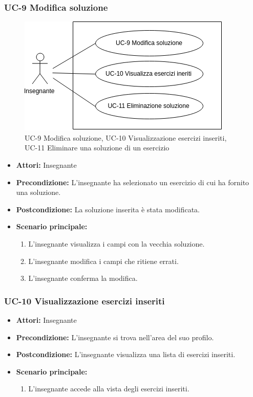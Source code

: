 \subsubsection{UC-9 Modifica soluzione}
\begin{figure}[h]
			\centering
			\includegraphics[scale=0.7]{images/UC-9.png}
			\caption{UC-9 Modifica soluzione, UC-10 Visualizzazione esercizi inseriti, UC-11 Eliminare una soluzione di un esercizio}
		\end{figure}
\begin{itemize}

\item \textbf{Attori: }Insegnante
\item \textbf{Precondizione: }L'insegnante ha selezionato un esercizio di cui ha fornito una soluzione.
\item \textbf{Postcondizione: }La soluzione inserita è stata modificata.
\item \textbf{Scenario principale: }
		\begin{enumerate}
		\item L'insegnante visualizza i campi con la vecchia soluzione.
		\item L'insegnante modifica i campi che ritiene errati.
		\item L'insegnante conferma la modifica.
		\end{enumerate}
\end{itemize}

\subsubsection{UC-10 Visualizzazione esercizi inseriti}
\begin{itemize}
\item \textbf{Attori: }Insegnante
		\item \textbf{Precondizione: }L'insegnante si trova nell'area del suo profilo.
		\item \textbf{Postcondizione: }L'insegnante visualizza una lista di esercizi inseriti. 
		\item \textbf{Scenario principale: }
		\begin{enumerate}
		\item L'insegnante accede alla vista degli esercizi inseriti.
		\end{enumerate}
	\end{itemize}
	
